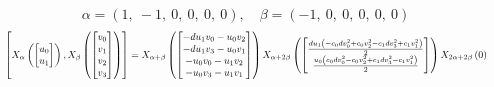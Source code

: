 \documentclass[11pt]{article}
\theoremstyle{definition}
\begin{document}
\[
\alpha = \left( 1, \  -1, \  0, \  0, \  0, \  0\right), \quad \beta = \left( -1, \  0, \  0, \  0, \  0, \  0\right)
\]
\[
\scaletoalign{\textwidth}{\left[ X_{\alpha}\left(\left[\begin{matrix}u_{0}\\u_{1}\end{matrix}\right]\right), X_{\beta}\left(\left[\begin{matrix}v_{0}\\v_{1}\\v_{2}\\v_{3}\end{matrix}\right]\right) \right] = X_{\alpha + \beta}\left(\left[\begin{matrix}- d u_{1} v_{0} - u_{0} v_{2}\\- d u_{1} v_{3} - u_{0} v_{1}\\- u_{0} v_{0} - u_{1} v_{2}\\- u_{0} v_{3} - u_{1} v_{1}\end{matrix}\right]\right) X_{\alpha + 2\beta}\left(\left[\begin{matrix}\frac{d u_{1} \left(- c_{0} d v_{0}^{2} + c_{0} v_{2}^{2} - c_{1} d v_{3}^{2} + c_{1} v_{1}^{2}\right)}{2}\\\frac{u_{0} \left(c_{0} d v_{0}^{2} - c_{0} v_{2}^{2} + c_{1} d v_{3}^{2} - c_{1} v_{1}^{2}\right)}{2}\end{matrix}\right]\right) X_{2\alpha + 2\beta}\left(0\right)}
\]
\end{document}
